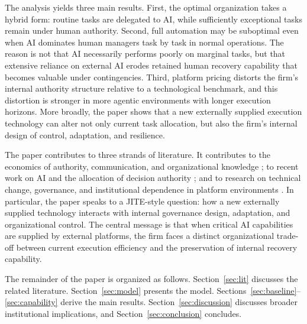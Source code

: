The analysis yields three main results. First, the optimal organization takes a hybrid form: routine tasks are delegated to AI, while sufficiently exceptional tasks remain under human authority. Second, full automation may be suboptimal even when AI dominates human managers task by task in normal operations. The reason is not that AI necessarily performs poorly on marginal tasks, but that extensive reliance on external AI erodes retained human recovery capability that becomes valuable under contingencies. Third, platform pricing distorts the firm's internal authority structure relative to a technological benchmark, and this distortion is stronger in more agentic environments with longer execution horizons. More broadly, the paper shows that a new externally supplied execution technology can alter not only current task allocation, but also the firm's internal design of control, adaptation, and resilience.

The paper contributes to three strands of literature. It contributes to the economics of authority, communication, and organizational knowledge \citep{AghionTirole1997,Dessein2002,Garicano2000}; to recent work on AI and the allocation of decision authority \citep{AtheyBryanGans2020,AgrawalGansGoldfarb2019}; and to research on technical change, governance, and institutional dependence in platform environments \citep{RochetTirole2003,BakerGibbonsMurphy2023,MarschakWei2024,MukherjeeSaha2024,Kim2025,NzembayieUrbano2026}. In particular, the paper speaks to a JITE-style question: how a new externally supplied technology interacts with internal governance design, adaptation, and organizational control. The central message is that when critical AI capabilities are supplied by external platforms, the firm faces a distinct organizational trade-off between current execution efficiency and the preservation of internal recovery capability.

The remainder of the paper is organized as follows. Section~\ref{sec:lit} discusses the related literature. Section~\ref{sec:model} presents the model. Sections~\ref{sec:baseline}--\ref{sec:capability} derive the main results. Section~\ref{sec:discussion} discusses broader institutional implications, and Section~\ref{sec:conclusion} concludes.
